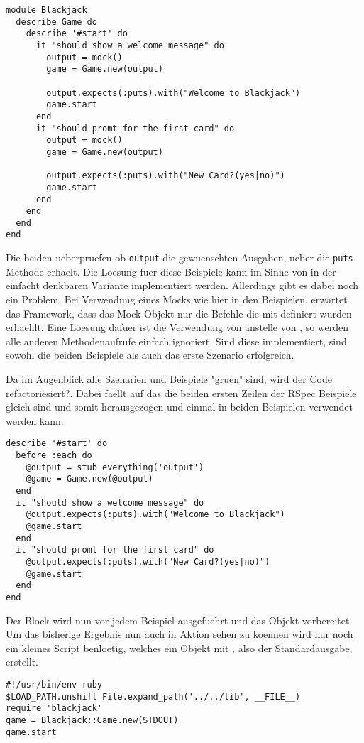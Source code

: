 \begin{lstlisting}
module Blackjack
  describe Game do
    describe '#start' do
      it "should show a welcome message" do
        output = mock()
        game = Game.new(output)

        output.expects(:puts).with("Welcome to Blackjack")
        game.start
      end
      it "should promt for the first card" do
        output = mock()
        game = Game.new(output)

        output.expects(:puts).with("New Card?(yes|no)")
        game.start
      end
    end
  end
end
\end{lstlisting}

Die beiden ueberpruefen ob \verb|output| die gewuenschten Ausgaben, ueber die \verb|puts| Methode erhaelt. Die Loesung fuer diese Beispiele kann im Sinne von \TDD in der einfacht denkbaren Variante implementiert werden.
Allerdings gibt es dabei noch ein Problem. Bei Verwendung eines Mocks wie hier in den Beispielen, erwartet das Framework, dass das Mock-Objekt nur die Befehle die mit  definiert wurden erhaehlt.
Eine Loesung dafuer ist die Verwendung von  anstelle von , so werden alle anderen Methodenaufrufe einfach ignoriert.
Sind diese implementiert, sind sowohl die beiden Beispiele als auch das erste Szenario erfolgreich.

Da im Augenblick alle Szenarien und Beispiele "gruen" sind, wird der Code refactoriesiert?. Dabei faellt auf das die beiden ersten Zeilen der RSpec Beispiele gleich sind und somit herausgezogen und einmal in beiden Beispielen verwendet werden kann.

\begin{lstlisting}
describe '#start' do
  before :each do
    @output = stub_everything('output')
    @game = Game.new(@output)
  end
  it "should show a welcome message" do
    @output.expects(:puts).with("Welcome to Blackjack")
    @game.start
  end
  it "should promt for the first card" do
    @output.expects(:puts).with("New Card?(yes|no)")
    @game.start
  end
end
\end{lstlisting}

Der  Block wird nun vor jedem Beispiel ausgefuehrt und das  Objekt vorbereitet.
Um das bisherige Ergebnis nun auch in Aktion sehen zu koennen wird nur noch ein kleines Script benloetig, welches ein  Objekt mit , also der Standardausgabe, erstellt.

\begin{lstlisting}
#!/usr/bin/env ruby
$LOAD_PATH.unshift File.expand_path('../../lib', __FILE__)
require 'blackjack'
game = Blackjack::Game.new(STDOUT)
game.start
\end{lstlisting}

